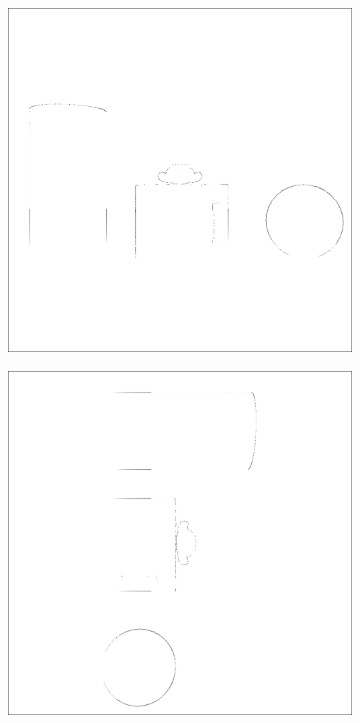 \begin{figure}[tb]
    \begin{subfigure}[t]{0.32\textwidth}
        \includegraphics[width=\linewidth]{chapter04/img/flexion-0001.png}
    \end{subfigure}
    \begin{subfigure}[t]{0.32\textwidth}
        \includegraphics[width=\linewidth]{chapter04/img/flexion-0030.png}

\end{subfigure}
\end{figure}

